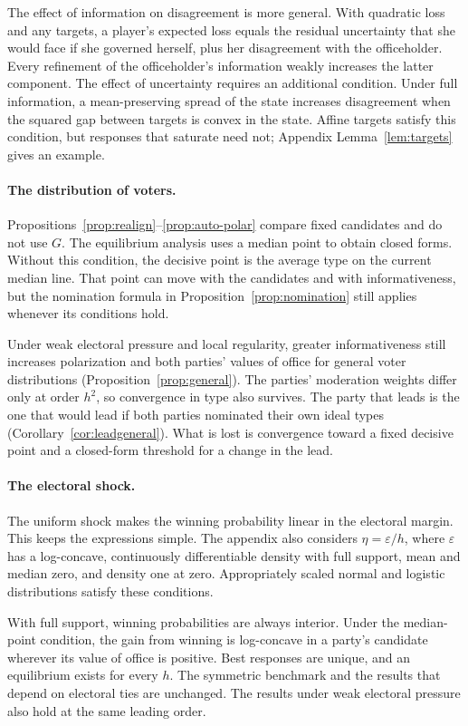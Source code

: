 \documentclass[12pt,letterpaper]{article}
\begin{document}
The effect of information on disagreement is more general. With quadratic loss and any targets, a player's expected loss equals the residual uncertainty that she would face if she governed herself, plus her disagreement with the officeholder. Every refinement of the officeholder's information weakly increases the latter component. The effect of uncertainty requires an additional condition. Under full information, a mean-preserving spread of the state increases disagreement when the squared gap between targets is convex in the state. Affine targets satisfy this condition, but responses that saturate need not; Appendix Lemma~\ref{lem:targets} gives an example.

\paragraph{The distribution of voters.}
Propositions~\ref{prop:realign}--\ref{prop:auto-polar} compare fixed candidates and do not use $G$. The equilibrium analysis uses a median point to obtain closed forms. Without this condition, the decisive point is the average type on the current median line. That point can move with the candidates and with informativeness, but the nomination formula in Proposition~\ref{prop:nomination} still applies whenever its conditions hold.

Under weak electoral pressure and local regularity, greater informativeness still increases polarization and both parties' values of office for general voter distributions (Proposition~\ref{prop:general}). The parties' moderation weights differ only at order $h^2$, so convergence in type also survives. The party that leads is the one that would lead if both parties nominated their own ideal types (Corollary~\ref{cor:leadgeneral}). What is lost is convergence toward a fixed decisive point and a closed-form threshold for a change in the lead.

\paragraph{The electoral shock.}
The uniform shock makes the winning probability linear in the electoral margin. This keeps the expressions simple. The appendix also considers $\eta=\varepsilon/h$, where $\varepsilon$ has a log-concave, continuously differentiable density with full support, mean and median zero, and density one at zero. Appropriately scaled normal and logistic distributions satisfy these conditions.

With full support, winning probabilities are always interior. Under the median-point condition, the gain from winning is log-concave in a party's candidate wherever its value of office is positive. Best responses are unique, and an equilibrium exists for every $h$. The symmetric benchmark and the results that depend on electoral ties are unchanged. The results under weak electoral pressure also hold at the same leading order.
\end{document}
